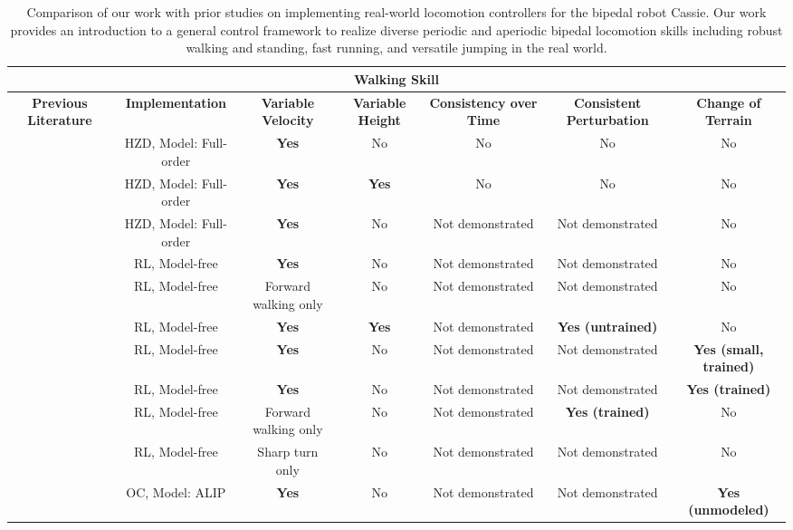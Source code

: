 \begin{table}[]
\centering
\tiny
\caption{Comparison of our work with prior studies on implementing real-world locomotion controllers for the bipedal robot Cassie. Our work provides an introduction to a general control framework to realize diverse periodic and aperiodic bipedal locomotion skills including robust walking and standing, fast running, and versatile jumping in the real world.}
\label{tab:cassie_work}
\begin{tabular}{ccccccc}
\hline
\multicolumn{7}{c}{\scriptsize{\textbf{Walking Skill}}} \\ \hline
\textbf{Previous Literature} & \textbf{Implementation} & \textbf{Variable Velocity} & \textbf{Variable Height} & \textbf{Consistency over Time} & \textbf{Consistent Perturbation} & \textbf{Change of Terrain} \\ \hline
\cite{gong2019feedback}& HZD, Model: Full-order & \textbf{Yes} & No & No & No & No \\
\cite{li2020animated,yang2022bayesian} & HZD, Model: Full-order & \textbf{Yes} & \textbf{Yes} & No & No & No \\
\cite{reher2021control} & HZD, Model: Full-order & \textbf{Yes} & No & Not demonstrated & Not demonstrated & No \\
\cite{xie2020learning} & RL, Model-free & \textbf{Yes} & No & Not demonstrated & Not demonstrated & No \\
\cite{siekmann2020learning} & RL, Model-free & Forward walking only & No & Not demonstrated & Not demonstrated & No \\
\cite{li2021reinforcement} & RL, Model-free & \textbf{Yes} & \textbf{Yes} & Not demonstrated & \textbf{Yes (untrained)} & No \\
\cite{siekmann2021sim} & RL, Model-free & \textbf{Yes} & No & Not demonstrated & Not demonstrated & \textbf{Yes (small, trained)} \\
\cite{siekmann2021blind} & RL, Model-free & \textbf{Yes} & No & Not demonstrated & Not demonstrated & \textbf{Yes (trained)} \\
\cite{dao2022sim} & RL, Model-free & Forward walking only & No & Not demonstrated & \textbf{Yes (trained)} & No \\
\cite{yu2022dynamic} & RL, Model-free & Sharp turn only & No & Not demonstrated & Not demonstrated & No \\
\cite{gong2022zero} & OC, Model: ALIP & \textbf{Yes} & No & Not demonstrated & Not demonstrated & \textbf{Yes (unmodeled)} \\

\end{tabular}
\end{table}
